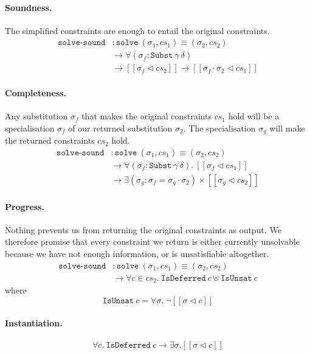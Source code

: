 \documentclass[sigplan,review,screen]{acmart}
\begin{document}
\paragraph{Soundness.}

The simplified constraints are enough to entail the original
constraints. \[
\begin{aligned}
\texttt{solve-sound}
&: \texttt{solve}~(\sigma_1, cs_1) \equiv (\sigma_2, cs_2) \\
&\to \forall (\sigma_f : \texttt{Subst}~\gamma~\delta) \\
& \to [\![ \sigma_f \triangleleft cs_2 ]\!] \to [\![ \sigma_f \cdot \sigma_2 \triangleleft cs_1 ]\!]
\end{aligned}
\]

\paragraph{Completeness.}

Any substitution \(\sigma_f\) that makes the original constraints
\(cs_1\) hold will be a specialisation \(\sigma_f\) of our returned
substitution \(\sigma_2\). The specialisation \(\sigma_g\) will make the
returned constraints \(cs_2\) hold. \[
\begin{aligned}
\texttt{solve-sound}
&: \texttt{solve}~(\sigma_1, cs_1) \equiv (\sigma_2, cs_2) \\
&\to \forall (\sigma_f : \texttt{Subst}~\gamma~\delta). ~ [\![ \sigma_f \triangleleft cs_1 ]\!] \\
&\to \exists (\sigma_g : \sigma_f = \sigma_g \cdot \sigma_2) \times [\![ \sigma_g \triangleleft cs_2 ]\!]
\end{aligned}
\]

\paragraph{Progress.}

Nothing prevents us from returning the original constraints as output.
We therefore promise that every constraint we return is either currently
unsolvable because we have not enough information, or is unsatisfiable
altogether. \[
\begin{aligned}
\texttt{solve-sound}
&: \texttt{solve}~(\sigma_1, cs_1) \equiv (\sigma_2, cs_2) \\
&\to \forall c \in cs_2. ~ \texttt{IsDeferred}~c \uplus \texttt{IsUnsat}~c
\end{aligned}
\] where \[
\texttt{IsUnsat}~c = \forall \sigma. ~ \neg [\![ \sigma \triangleleft c ]\!]
\]

\paragraph{Instantiation.}

\[
\forall c. ~ \texttt{IsDeferred}~c \to \exists \sigma. [\![ \sigma \triangleleft c ]\!]
\]
\end{document}
